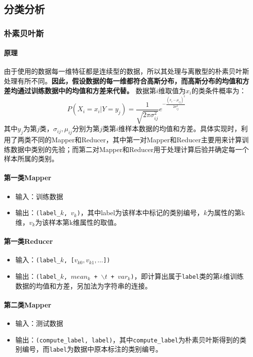 \documentclass{ML}
\begin{document}
\subsection{分类分析}
\subsubsection{朴素贝叶斯}
\paragraph{原理}
由于使用的数据每一维特征都是连续型的数据，所以其处理与离散型的朴素贝叶斯处理有所不同。\textbf{因此，假设数据的每一维都符合高斯分布，而高斯分布的均值和方差均通过训练数据中的均值和方差来代替。}
数据第$i$维取值为$x_i$的类条件概率为：
$$
    P(X_i = x_i | Y = y_j) = \dfrac{1}{\sqrt{2\pi\sigma_{ij}^2}}e^{-\frac{(x_i - \mu_{ij})^2}{2\sigma_{ij}^2}}
$$
其中$y_j$为第$j$类，$\sigma_{ij}, \mu_{ij}$分别为第$j$类第$i$维样本数据的均值和方差。具体实现时，利用了两类不同的Mapper和Reducer，其中第一对Mapper和Reducer主要用来计算训练数据中类别的先验；而第二对Mapper和Reducer用于处理计算后验并确定每一个样本所属的类别。

\paragraph{第一类Mapper}
\begin{itemize}
    \item 输入：训练数据
    \item 输出：\texttt{(label\_$k$, $v_k$)}，其中label为该样本中标记的类别编号，$k$为属性的第k维，$v_k$为该样本第k维属性的取值。
\end{itemize}
\paragraph{第一类Reducer}
\begin{itemize}
    \item 输入：\texttt{(label\_$k$, [$v_{k0}, v_{k1}, \dots$])}
    \item 输出：\texttt{(label\_$k$, $mean_k$ + $\backslash t$ + $var_k$)}，即计算出属于\texttt{label}类的第$k$维训练数据的均值和方差，另加法为字符串的连接。
\end{itemize}
\paragraph{第二类Mapper}
\begin{itemize}
    \item 输入：测试数据
    \item 输出：\texttt{(compute\_label, label)}，其中\texttt{compute\_label}为朴素贝叶斯得到的类别编号，而\texttt{label}为数据中原本标注的类别编号。
\end{itemize}
\end{document}

